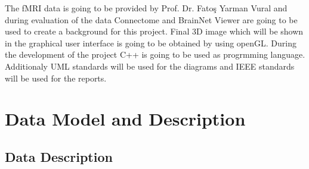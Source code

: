 \documentclass[paper=a4, fontsize=12pt]{scrartcl}	%
\numberwithin{equation}{section}		%
\numberwithin{figure}{section}			%
\numberwithin{table}{section}				%
\newcommand{\skipsubsection}[0]{\vspace{1cm}}
\begin{document}
    The fMRI data is going to be provided by Prof. Dr. Fatoş Yarman Vural and during evaluation of the data Connectome and BrainNet Viewer are going to be used to create a background for this project. Final 3D image which will be shown in the graphical user interface is going to be obtained by using openGL. During the development of the project C++ is going to be used as progrmming language. \\
    
    Additionaly UML standards will be used for the diagrams and IEEE standards will be used for the reports.\\

	\newpage
	\section{Data Model and Description}
            
    \skipsubsection 
        
	\subsection{Data Description}
\end{document}

